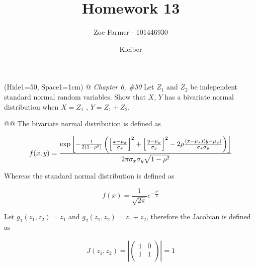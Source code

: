 \documentclass[11pt]{article}\usepackage[]{graphicx}\usepackage[]{xcolor}
\title{Homework 13}
\date{Kleiber}
\author{Zoe Farmer - 101446930}
\begin{document}
\maketitle

\begin{table}[H]
    \centering
\end{table}

\begin{easylist}[enumerate]
    \ListProperties(Hide1=50, Space1=1cm)
    @ \textit{Chapter 6, \#50} Let $Z_1$ and $Z_2$ be independent standard normal random variables. Show that $X$, $Y$
    has a bivariate normal distribution when $X = Z_1$ , $Y = Z_1 + Z_2$.

    @@ The bivariate normal distribution is defined as

    \begin{equation}
        f(x, y) =
            \frac{%
            \exp \left[
                - \frac{1}{2\left( 1 - \rho^2 \right)}
                \left(
                    {\left[ \frac{x - \mu_x}{\sigma_x} \right]}^2 +
                    {\left[ \frac{y - \mu_y}{\sigma_y} \right]}^2 -
                    2 \rho \frac{(x - \mu_x)(y - \mu_y)}{\sigma_x\sigma_y}
                \right)
            \right]}{2\pi \sigma_x \sigma_y \sqrt{1 - \rho^2}}
    \end{equation}

    Whereas the standard normal distribution is defined as

    \begin{equation}
        f(x) = \frac{1}{\sqrt{2\pi}} e^{ -\frac{x^2}{2} }
    \end{equation}

    Let $g_1(z_1, z_2) = z_1$ and $g_2(z_1, z_2) = z_1 + z_2$, therefore the Jacobian is defined as

    \begin{equation}
        \begin{aligned}
            J(z_1, z_2) = \left| \begin{pmatrix}
                                     1 & 0\\
                                     1 & 1\\
                                 \end{pmatrix}
                          \right| = 1
        \end{aligned}
    \end{equation}


\end{easylist}
\end{document}

